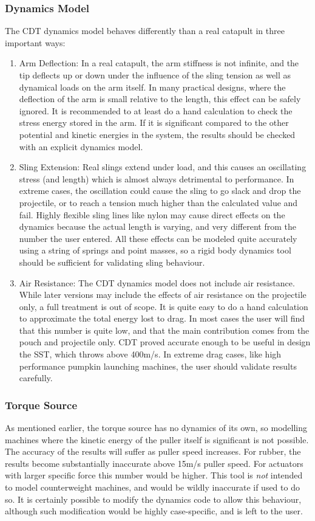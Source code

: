 \documentclass{article}
\begin{document}
\subsubsection{Dynamics Model}
The CDT dynamics model behaves differently than a real catapult in three important ways:
\begin{enumerate}
    \item Arm Deflection: In a real catapult, the arm stiffness is not infinite, and the tip deflects up or down under the influence of the sling tension as well as dynamical loads on the arm itself. In many practical designs, where the deflection of the arm is small relative to the length, this effect can be safely ignored. It is recommended to at least do a hand calculation to check the stress energy stored in the arm. If it is significant compared to the other potential and kinetic energies in the system, the results should be checked with an explicit dynamics model.
    \item Sling Extension: Real slings extend under load, and this causes an oscillating stress (and length) which is almost always detrimental to performance. In extreme cases, the oscillation could cause the sling to go slack and drop the projectile, or to reach a tension much higher than the calculated value and fail. Highly flexible sling lines like nylon may cause direct effects on the dynamics because the actual length is varying, and very different from the number the user entered. All these effects can be modeled quite accurately using a string of springs and point masses, so a rigid body dynamics tool should be sufficient for validating sling behaviour.
    \item Air Resistance: The CDT dynamics model does not include air resistance. While later versions may include the effects of air resistance on the projectile only, a full treatment is out of scope. It is quite easy to do a hand calculation to approximate the total energy lost to drag. In most cases the user will find that this number is quite low, and that the main contribution comes from the pouch and projectile only. CDT proved accurate enough to be useful in design the SST, which throws above 400m/s. In extreme drag cases, like high performance pumpkin launching machines, the user should validate results carefully.
\end{enumerate}

\subsubsection{Torque Source} \label{Torque Source}
As mentioned earlier, the torque source has no dynamics of its own, so modelling machines where the kinetic energy of the puller itself is significant is not possible. The accuracy of the results will suffer as puller speed increases. For rubber, the results become substantially inaccurate above 15m/s puller speed. For actuators with larger specific force this number would be higher. This tool is \emph{not} intended to model counterweight machines, and would be wildly inaccurate if used to do so. It is certainly possible to modify the dynamics code to allow this behaviour, although such modification would be highly case-specific, and is left to the user.
\end{document}
